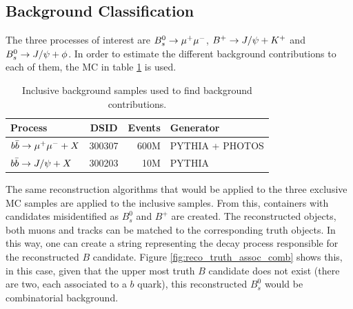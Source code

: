 \subsection{Background Classification}
\label{sub:sec:bkgclass}
\graphicspath{ {figures/InternalNote_BackgroundModeling/} }

The three processes of interest are $B_{s}^{0}\rightarrow \mu^{+}\mu^{-}$, $B^{+}\rightarrow J/\psi+K^{+}$ and $B_{s}^{0}\rightarrow J/\psi + \phi$. In order to estimate the different
background contributions to each of them, the MC in table \ref{table:inclusive_mc} is used.

\begin{table}[h!]
    \centering
    \begin{tabular}{|l | c | r | l|} 
	\hline
	Process & DSID & Events & Generator\\ [0.5ex] 
	\hline
	\hline
	$b\bar{b}\rightarrow\mu^+\mu^-+X$ & 300307 & 600M & PYTHIA + PHOTOS\\ 
	$b\bar{b}\rightarrow J/\psi+X$ & 300203 & 10M & PYTHIA\\ [1ex] 
	\hline
    \end{tabular}
    \caption{Inclusive background samples used to find background contributions.}
    \label{table:inclusive_mc}
\end{table}

The same reconstruction algorithms that would be applied to the three exclusive MC samples
are applied to the inclusive samples. From this, containers with candidates misidentified as
$B_{s}^{0}$ and $B^{+}$ are created. The reconstructed objects, both muons and tracks can be 
matched to the corresponding truth objects. In this way, one can create a string representing the
decay process responsible for the reconstructed $B$ candidate. Figure \ref{fig:reco_truth_assoc_comb}
shows this, in this case, given that the upper most truth $B$ candidate does not exist (there are two,
each associated to a $b$ quark), this reconstructed $B_{s}^{0}$ would be combinatorial background.

